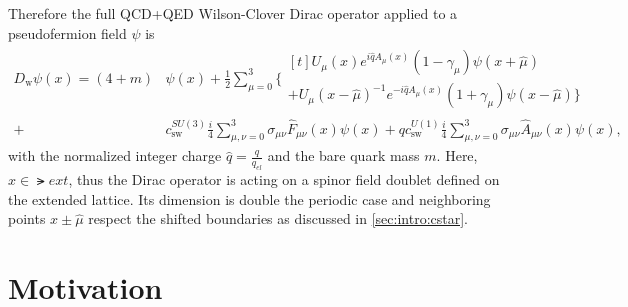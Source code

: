 Therefore the full QCD+QED Wilson-Clover Dirac operator applied to a pseudofermion field $\psi$ is
\begin{equation}
\begin{aligned} \label{eq:Dw:QCD+QED}
D_\mathrm{w} \psi(x) = \left( 4 + m \right) &\psi(x) + \frac{1}{2} \sum_{\mu=0}^3
\Big\{
  \begin{multlined}[t]
    U_{\mu}(x)e^{i \hat{q} A_{\mu}(x)} (1-\gamma_{\mu}) \psi(x + \hat{\mu}) \\
   +U_{\mu}(x-\hat{\mu})^{-1}e^{-i \hat{q} A_{\mu}(x) } (1+\gamma_{\mu}) \psi(x-\hat{\mu})
\Big\} \end{multlined} \\
+&c_\mathrm{sw}^{SU(3)} \frac{i}{4} \sum_{\mu,\nu=0}^3 \sigma_{\mu \nu} \hat{F}_{\mu \nu}(x) \psi(x)
+q c_\mathrm{sw}^{U(1)} \frac{i}{4} \sum_{\mu,\nu=0}^3 \sigma_{\mu \nu} \hat{A}_{\mu \nu}(x) \psi(x),
\end{aligned}
\end{equation}
with the normalized integer charge $\hat{q} = \frac{q}{q_{el}}$ and the bare quark mass $m$.
Here, $x \in \lat{ext}$, thus the Dirac operator is acting on a spinor field doublet defined on the extended lattice.
Its dimension is double the periodic case and neighboring points $x \pm \hat{\mu}$ respect the shifted boundaries as discussed in \cref{sec:intro:cstar}.
































\section{Motivation}
\label{sec:intro:motivation}


